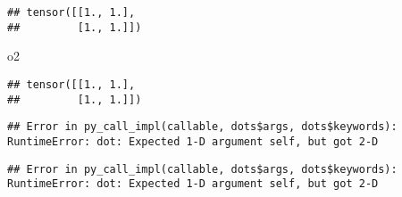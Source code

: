\documentclass[]{book}
\newenvironment{Shaded}{\begin{snugshade}}{\end{snugshade}}
\newcommand{\CommentTok}[1]{\textcolor[rgb]{0.56,0.35,0.01}{\textit{#1}}}
\newcommand{\KeywordTok}[1]{\textcolor[rgb]{0.13,0.29,0.53}{\textbf{#1}}}
\newcommand{\NormalTok}[1]{#1}
\newcommand{\OperatorTok}[1]{\textcolor[rgb]{0.81,0.36,0.00}{\textbf{#1}}}
\newcommand{\StringTok}[1]{\textcolor[rgb]{0.31,0.60,0.02}{#1}}
\begin{document}
\begin{Shaded}
\end{Shaded}

\begin{verbatim}
## tensor([[1., 1.],
##         [1., 1.]])
\end{verbatim}

\begin{Shaded}
\begin{Highlighting}[]
\NormalTok{o2}
\end{Highlighting}
\end{Shaded}

\begin{verbatim}
## tensor([[1., 1.],
##         [1., 1.]])
\end{verbatim}

\begin{Shaded}
\end{Shaded}

\begin{verbatim}
## Error in py_call_impl(callable, dots$args, dots$keywords): RuntimeError: dot: Expected 1-D argument self, but got 2-D
\end{verbatim}

\begin{Shaded}
\end{Shaded}

\begin{verbatim}
## Error in py_call_impl(callable, dots$args, dots$keywords): RuntimeError: dot: Expected 1-D argument self, but got 2-D
\end{verbatim}

\begin{Shaded}
\end{Shaded}
\end{document}

